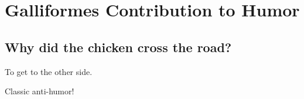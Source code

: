 \section{Galliformes Contribution to Humor}

\subsection{Why did the chicken cross the road?}

To get to the other side.

Classic anti-humor!

\printindex